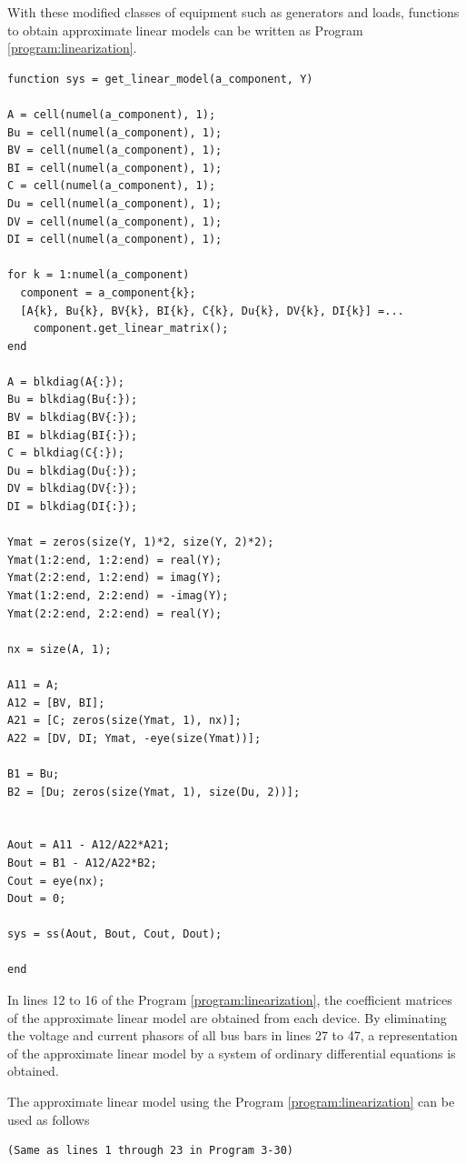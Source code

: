 \documentclass[tombow,dvipdfmx]{corona-a5-1.1}
\begin{document}
\begin{例}
With these modified classes of equipment such as generators and loads, functions to obtain approximate linear models can be written as Program \ref{program:linearization}.

\smallskip
\begin{PROGRAMA}[count,title={get\_linear\_model.m}]\label{program:linearization}
\begin{verbatim}
function sys = get_linear_model(a_component, Y)

A = cell(numel(a_component), 1);
Bu = cell(numel(a_component), 1);
BV = cell(numel(a_component), 1);
BI = cell(numel(a_component), 1);
C = cell(numel(a_component), 1);
Du = cell(numel(a_component), 1);
DV = cell(numel(a_component), 1);
DI = cell(numel(a_component), 1);

for k = 1:numel(a_component)
  component = a_component{k};
  [A{k}, Bu{k}, BV{k}, BI{k}, C{k}, Du{k}, DV{k}, DI{k}] =...
    component.get_linear_matrix();
end

A = blkdiag(A{:});
Bu = blkdiag(Bu{:});
BV = blkdiag(BV{:});
BI = blkdiag(BI{:});
C = blkdiag(C{:});
Du = blkdiag(Du{:});
DV = blkdiag(DV{:});
DI = blkdiag(DI{:});

Ymat = zeros(size(Y, 1)*2, size(Y, 2)*2);
Ymat(1:2:end, 1:2:end) = real(Y);
Ymat(2:2:end, 1:2:end) = imag(Y);
Ymat(1:2:end, 2:2:end) = -imag(Y);
Ymat(2:2:end, 2:2:end) = real(Y);

nx = size(A, 1);

A11 = A;
A12 = [BV, BI];
A21 = [C; zeros(size(Ymat, 1), nx)];
A22 = [DV, DI; Ymat, -eye(size(Ymat))];

B1 = Bu;
B2 = [Du; zeros(size(Ymat, 1), size(Du, 2))];


Aout = A11 - A12/A22*A21;
Bout = B1 - A12/A22*B2;
Cout = eye(nx);
Dout = 0;

sys = ss(Aout, Bout, Cout, Dout);

end
\end{verbatim}
\end{PROGRAMA}

In lines 12 to 16 of the Program \ref{program:linearization}, the coefficient matrices of the approximate linear model are obtained from each device.
By eliminating the voltage and current phasors of all bus bars in lines 27 to 47, a representation of the approximate linear model by a system of ordinary differential equations is obtained.

The approximate linear model using the Program \ref{program:linearization} can be used as follows

\smallskip
\begin{PROGRAMA}[count,title={load\_impedance.m}]\label{program:main_linearization}
\begin{verbatim}
(Same as lines 1 through 23 in Program 3-30)


\end{verbatim}
\end{PROGRAMA}
\end{例}
\end{document}
